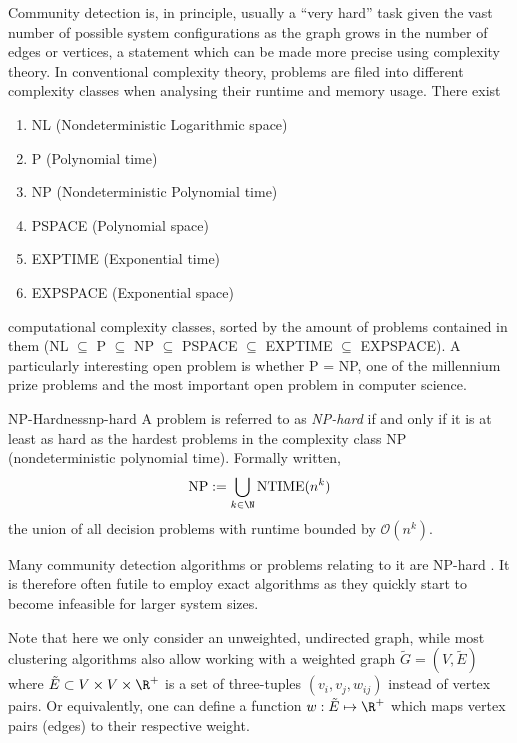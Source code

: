 \documentclass[12pt, a4paper]{article}
\begin{document}
  Community detection is, in principle, usually a ``very hard'' task given the vast number of possible system configurations as the graph grows in the number of edges or vertices, a statement which can be made more precise using complexity theory.
  In conventional complexity theory, problems are filed into different complexity classes when analysing their runtime and memory usage.
  There exist
  \begin{enumerate}[noitemsep,topsep=0pt,parsep=0pt,partopsep=0pt]
    \item NL (Nondeterministic Logarithmic space)
    \item P (Polynomial time)
    \item NP (Nondeterministic Polynomial time)
    \item PSPACE (Polynomial space)
    \item EXPTIME (Exponential time)
    \item EXPSPACE (Exponential space)
  \end{enumerate}
  computational complexity classes, sorted by the amount of problems contained in them (NL $\subseteq$ P $\subseteq$ NP $\subseteq$ PSPACE $\subseteq$ EXPTIME $\subseteq$ EXPSPACE).
  A particularly interesting open problem is whether P = NP, one of the millennium prize problems and the most important open problem in computer science.

  \begin{definition}{NP-Hardness}{np-hard}
    A problem is referred to as \textit{NP-hard} if and only if it is at least as hard as the hardest problems in the complexity class NP (nondeterministic polynomial time). Formally written,
    $$\mathrm{NP} := \bigcup_{k \in \N} \mathrm{NTIME}(n^k)$$
    the union of all decision problems with runtime bounded by $\mathcal{O}(n^k)$.
  \end{definition}

  Many community detection algorithms or problems relating to it are NP-hard \parencite{fortunato}.
  It is therefore often futile to employ exact algorithms as they quickly start to become infeasible for larger system sizes.

  Note that here we only consider an unweighted, undirected graph, while most clustering algorithms also allow working with a weighted graph $\tilde{G} = (V, \tilde{E})$ where $\tilde{E} \subset V \times V \times \R^+$ is a set of three-tuples $(v_i, v_j, w_{ij})$ instead of vertex pairs. Or equivalently, one can define a function $w: \tilde{E} \mapsto \R^+$ which maps vertex pairs (edges) to their respective weight.
\end{document}
